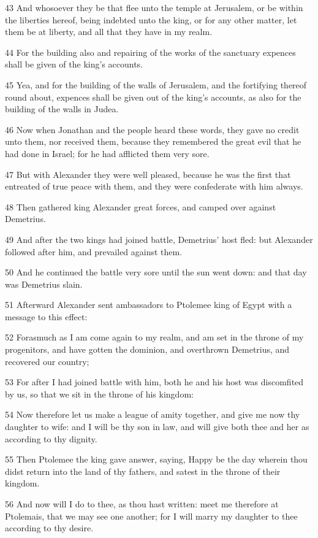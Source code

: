 \par 43 And whosoever they be that flee unto the temple at Jerusalem, or be within the liberties hereof, being indebted unto the king, or for any other matter, let them be at liberty, and all that they have in my realm.
\par 44 For the building also and repairing of the works of the sanctuary expences shall be given of the king's accounts.
\par 45 Yea, and for the building of the walls of Jerusalem, and the fortifying thereof round about, expences shall be given out of the king's accounts, as also for the building of the walls in Judea.
\par 46 Now when Jonathan and the people heard these words, they gave no credit unto them, nor received them, because they remembered the great evil that he had done in Israel; for he had afflicted them very sore.
\par 47 But with Alexander they were well pleased, because he was the first that entreated of true peace with them, and they were confederate with him always.
\par 48 Then gathered king Alexander great forces, and camped over against Demetrius.
\par 49 And after the two kings had joined battle, Demetrius' host fled: but Alexander followed after him, and prevailed against them.
\par 50 And he continued the battle very sore until the sun went down: and that day was Demetrius slain.
\par 51 Afterward Alexander sent ambassadors to Ptolemee king of Egypt with a message to this effect:
\par 52 Forasmuch as I am come again to my realm, and am set in the throne of my progenitors, and have gotten the dominion, and overthrown Demetrius, and recovered our country;
\par 53 For after I had joined battle with him, both he and his host was discomfited by us, so that we sit in the throne of his kingdom:
\par 54 Now therefore let us make a league of amity together, and give me now thy daughter to wife: and I will be thy son in law, and will give both thee and her as according to thy dignity.
\par 55 Then Ptolemee the king gave answer, saying, Happy be the day wherein thou didst return into the land of thy fathers, and satest in the throne of their kingdom.
\par 56 And now will I do to thee, as thou hast written: meet me therefore at Ptolemais, that we may see one another; for I will marry my daughter to thee according to thy desire.
